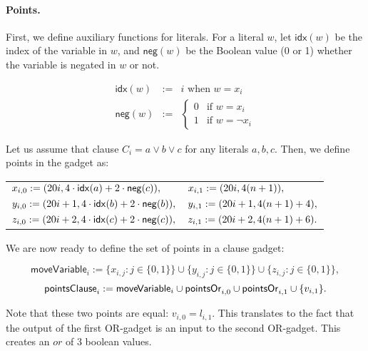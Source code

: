 \paragraph{Points.}

\newcommand{\pointsClause}[1]{\mathsf{pointsClause}_{#1}}
\newcommand{\negate}{\mathsf{neg}}
\newcommand{\idx}{\mathsf{idx}}


First, we define auxiliary functions for literals. 
For a literal $w$, let $\idx(w)$ be the index of the variable in $w$,
and $\negate(w)$ be the Boolean value (0 or 1) whether the variable is negated in $w$
or not.

\begin{eqnarray*}
\idx(w) & := &  i \text{ when } w = x_i \\
\negate(w) & := & 
\begin{cases}
 0 & \text{if } w = x_i \\
 1 & \text{if } w = \neg x_i
\end{cases}
\end{eqnarray*}

Let us assume that clause $C_i = a \lor b \lor c$
for any literals $a,b,c$. Then, we define points in the gadget as:

\begin{center}
\begin{tabular}{ l l }
	$x_{i, 0} := (\clauseXFactor i, 4\cdot \idx(a) + 2\cdot \negate(c)),$ &
	$x_{i, 1} := (20 i, 4(n+1)),$ \\
	$y_{i, 0} := (\clauseXFactor i+1, 4\cdot \idx(b) + 2\cdot \negate(b)),$ &
	$y_{i, 1} := (20 i+1, 4(n+1) + 4),$ \\
	$z_{i, 0} := (\clauseXFactor i+2, 4\cdot \idx(c) + 2\cdot \negate(c)),$ &
	$z_{i, 1} := (20 i+2, 4(n+1) + 6).$
\end{tabular}
\end{center}

\newcommand{\segmentsClause}{\mathsf{segmentsClause}}	
 
We are now ready to define the set of points in a clause gadget:
 
 $$\mathsf{moveVariable}_i := 
 \{x_{i, j} : j \in \{0, 1\}\} \cup
 \{y_{i, j} : j \in \{0, 1\}\} \cup
 \{z_{i, j} : j \in \{0, 1\}\},
 $$
 $$\pointsClause{i} := 
 \mathsf{moveVariable}_i \cup \pointsOr{i}{0}
 \cup \pointsOr{i}{1} \cup \{v_{i, 1} \}.
 $$
 
Note that these two points are equal: $v_{i,0} = l_{i,1}$.
This translates to the fact that the output of the first OR-gadget
is an input to the second OR-gadget.
This creates an $or$ of 3 boolean values.

